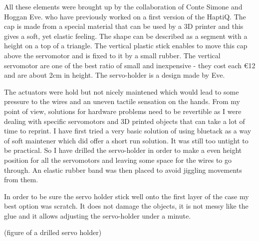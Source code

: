 All these elements were brought up by the collaboration of Conte Simone
and Hoggan Eve. who have previously worked on a first version of the
HaptiQ. The cap is made from a special material that can be used by a 3D
printer and this gives a soft, yet elastic feeling. The shape can be
described as a segment with a height on a top of a triangle. The
vertical plastic stick enables to move this cap above the servomotor and
is fixed to it by a small rubber. The vertical servomotor are one of the
best ratio of small and inexpensive - they cost each \euro{12} and are
about 2cm in height. The servo-holder is a design made by Eve.

The actuators were hold but not nicely maintened which would lead to
some pressure to the wires and an uneven tactile sensation on the hands.
From my point of view, solutions for hardware problems need to be
revertible as I were dealing with specific servomotors and 3D printed
objects that can take a lot of time to reprint. I have first tried a
very basic solution of using bluetack as a way of soft maintener which
did offer a short run solution. It was still too untight to be
practical. So I have drilled the servo-holder in order to make a even
height position for all the servomotors and leaving some space for the
wires to go through. An elastic rubber band was then placed to avoid
jiggling movements from them.

In order to be sure the servo holder stick well onto the first layer of
the case my best option was scratch. It does not damage the objects, it
is not messy like the glue and it allows adjusting the servo-holder
under a minute.

(figure of a drilled servo holder)


